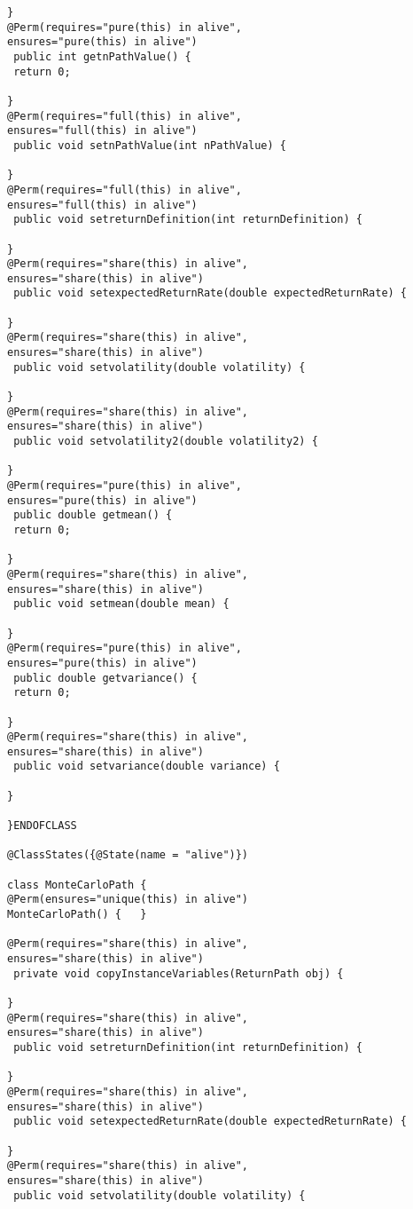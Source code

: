 \documentclass[10pt]{article}
\begin{document}
\begin{lstlisting}
} 
@Perm(requires="pure(this) in alive",
ensures="pure(this) in alive")
 public int getnPathValue() {
 return 0;
 
} 
@Perm(requires="full(this) in alive",
ensures="full(this) in alive")
 public void setnPathValue(int nPathValue) {
 
} 
@Perm(requires="full(this) in alive",
ensures="full(this) in alive")
 public void setreturnDefinition(int returnDefinition) {
 
} 
@Perm(requires="share(this) in alive",
ensures="share(this) in alive")
 public void setexpectedReturnRate(double expectedReturnRate) {
 
} 
@Perm(requires="share(this) in alive",
ensures="share(this) in alive")
 public void setvolatility(double volatility) {
 
} 
@Perm(requires="share(this) in alive",
ensures="share(this) in alive")
 public void setvolatility2(double volatility2) {
 
} 
@Perm(requires="pure(this) in alive",
ensures="pure(this) in alive")
 public double getmean() {
 return 0;
 
} 
@Perm(requires="share(this) in alive",
ensures="share(this) in alive")
 public void setmean(double mean) {
 
} 
@Perm(requires="pure(this) in alive",
ensures="pure(this) in alive")
 public double getvariance() {
 return 0;
 
} 
@Perm(requires="share(this) in alive",
ensures="share(this) in alive")
 public void setvariance(double variance) {
 
} 

}ENDOFCLASS

@ClassStates({@State(name = "alive")})

class MonteCarloPath {
@Perm(ensures="unique(this) in alive")
MonteCarloPath() {   }

@Perm(requires="share(this) in alive",
ensures="share(this) in alive")
 private void copyInstanceVariables(ReturnPath obj) {
 
} 
@Perm(requires="share(this) in alive",
ensures="share(this) in alive")
 public void setreturnDefinition(int returnDefinition) {
 
} 
@Perm(requires="share(this) in alive",
ensures="share(this) in alive")
 public void setexpectedReturnRate(double expectedReturnRate) {
 
} 
@Perm(requires="share(this) in alive",
ensures="share(this) in alive")
 public void setvolatility(double volatility) {
 

\end{lstlisting}
\end{document}
